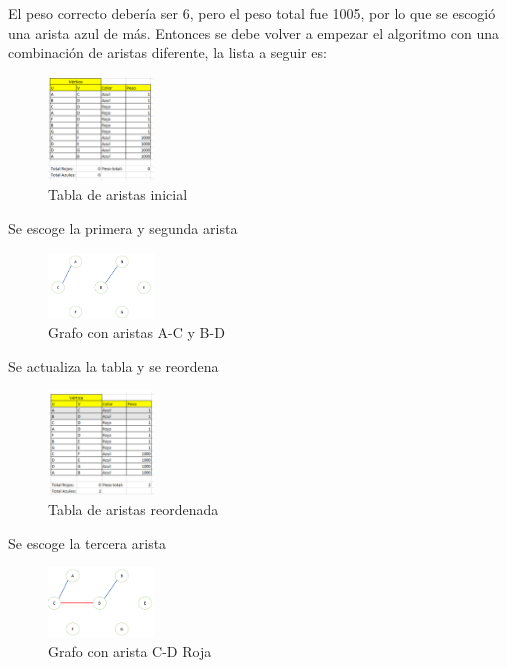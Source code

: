 \documentclass[conference,compsoc]{IEEEtran}
\begin{document}
El peso correcto debería ser 6, pero el peso total fue 1005, por lo que se escogió una arista azul de más.
Entonces se debe volver a empezar el algoritmo con una combinación de aristas diferente, la lista a seguir es:

\begin{figure}[h] 
    \centering
    \includegraphics[width=0.25\textwidth]{Problema2/s12.png}
    \caption{Tabla de aristas inicial}
    \label{fig:mesh1}
\end{figure}
$$$$
Se escoge la primera y segunda arista

\begin{figure}[h] 
    \centering
    \includegraphics[width=0.25\textwidth]{Problema2/s13.png}
    \caption{Grafo con aristas A-C y B-D}
    \label{fig:mesh1}
\end{figure}

Se actualiza la tabla y se reordena

\begin{figure}[h] 
    \centering
    \includegraphics[width=0.25\textwidth]{Problema2/s14.png}
    \caption{Tabla de aristas reordenada}
    \label{fig:mesh1}
\end{figure}

Se escoge la tercera arista

\begin{figure}[h] 
    \centering
    \includegraphics[width=0.25\textwidth]{Problema2/s15.png}
    \caption{Grafo con arista C-D Roja}
    \label{fig:mesh1}
\end{figure}
\end{document}
